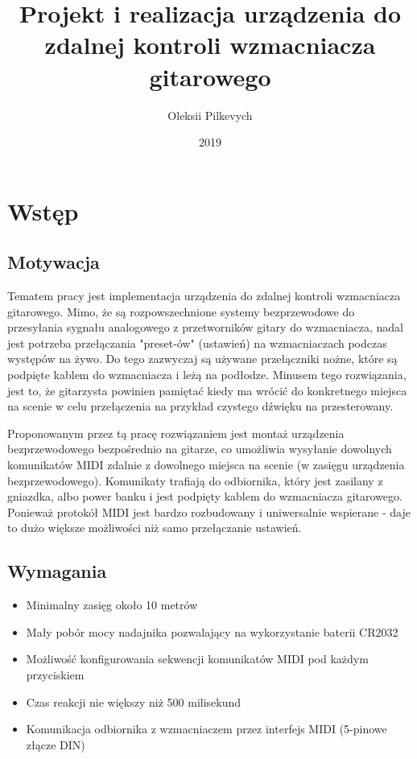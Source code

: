 \documentclass[eng,printmode]{mgr}
\title{Projekt i realizacja urządzenia do zdalnej kontroli wzmacniacza gitarowego}
\author{Oleksii Pilkevych}
\date{2019} %
\begin{document}

\maketitle %

\tableofcontents %

\chapter{Wstęp}
\section{Motywacja}

Tematem pracy jest implementacja urządzenia do zdalnej kontroli wzmacniacza gitarowego. Mimo, że są rozpowszechnione systemy bezprzewodowe do przesyłania sygnału analogowego z przetworników gitary do wzmacniacza, nadal jest potrzeba przełączania "preset-ów" (ustawień) na wzmacniaczach podczas występów na żywo. Do tego zazwyczaj są używane przełączniki nożne, które są podpięte kablem do wzmacniacza i leżą na podłodze. Minusem tego rozwiązania, jest to, że gitarzysta powinien pamiętać kiedy ma wrócić do konkretnego miejsca na scenie w celu przełączenia na przykład czystego dźwięku na przesterowany.

Proponowanym przez tą pracę rozwiązaniem jest montaż urządzenia bezprzewodowego bezpośrednio na gitarze, co umożliwia wysyłanie dowolnych komunikatów MIDI zdalnie z dowolnego miejsca na scenie (w zasięgu urządzenia bezprzewodowego).
Komunikaty trafiają do odbiornika, który jest zasilany z gniazdka, albo power banku i jest podpięty kablem do wzmacniacza gitarowego.
Ponieważ protokół MIDI jest bardzo rozbudowany i uniwersalnie wspierane - daje to dużo większe możliwości niż samo przełączanie ustawień.

\section{Wymagania}

\begin{itemize}
\item Minimalny zasięg około 10 metrów
\item Mały pobór mocy nadajnika pozwalający na wykorzystanie baterii CR2032
\item Możliwość konfigurowania sekwencji komunikatów MIDI pod każdym przyciskiem
\item Czas reakcji nie większy niż 500 milisekund
\item Komunikacja odbiornika z wzmacniaczem przez interfejs MIDI (5-pinowe złącze DIN)
\end{itemize}
\end{document}
